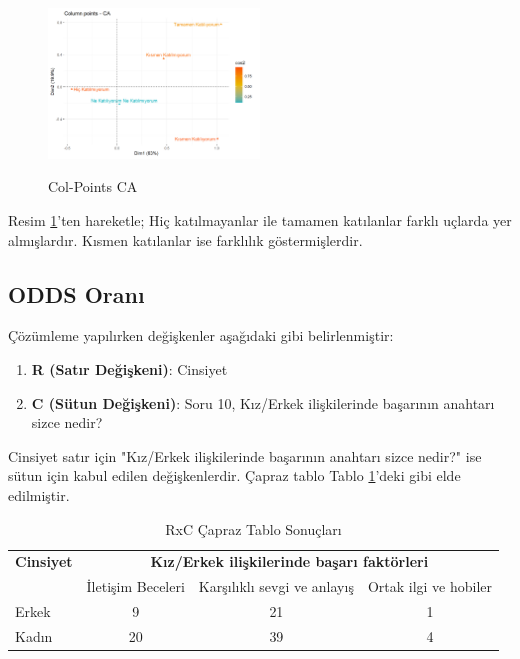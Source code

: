 \documentclass{article}
\begin{document}
\begin{figure}[htbp]
    \centering
    \caption{Col-Points CA}
    \includegraphics[width=0.5\textwidth]{Imgs/col-points.png}
    \label{col-plot}
\end{figure}

Resim \ref{col-plot}'ten hareketle;
Hiç katılmayanlar ile tamamen katılanlar farklı uçlarda yer almışlardır. Kısmen katılanlar ise farklılık göstermişlerdir.

\clearpage
\subsection{ODDS Oranı}
Çözümleme yapılırken değişkenler aşağıdaki gibi belirlenmiştir:
\begin{enumerate}
    \item \textbf{R (Satır Değişkeni)}: Cinsiyet
    \item \textbf{C (Sütun Değişkeni)}: Soru 10, Kız/Erkek ilişkilerinde başarının anahtarı sizce nedir?
\end{enumerate}
Cinsiyet satır için "Kız/Erkek ilişkilerinde başarının anahtarı sizce nedir?" ise sütun için kabul edilen değişkenlerdir. Çapraz tablo Tablo \ref{tab:relations}'deki gibi elde edilmiştir.
\begin{table}[h]
    \centering
    \caption{RxC Çapraz Tablo Sonuçları}
    \begin{tabular}{|l|c|c|c|}
        \hline
        \multicolumn{1}{|c|}{\textbf{Cinsiyet}} & \multicolumn{3}{c|}{\textbf{Kız/Erkek ilişkilerinde başarı faktörleri}} \\
        \cline{2-4}
        & İletişim Beceleri & Karşılıklı sevgi ve anlayış & Ortak ilgi ve hobiler \\
        \hline
        Erkek & 9 & 21 & 1 \\
        Kadın & 20 & 39 & 4 \\
        \hline
    \end{tabular}
    \label{tab:relations}
\end{table}
\end{document}
